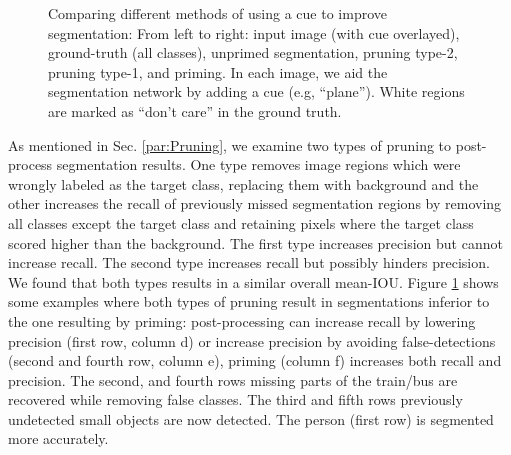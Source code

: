\documentclass[10pt,letterpaper,twocolumn]{article}
\begin{document}
\begin{figure}
\begin{centering}
\caption{\label{fig:summary-segmentation}Comparing different methods of using
a cue to improve segmentation: From left to right: input image (with
cue overlayed), ground-truth (all classes), unprimed segmentation,
pruning type-2, pruning type-1, and priming. In each image, we aid
the segmentation network by adding a cue (e.g, ``plane''). White
regions are marked as ``don't care'' in the ground truth. }
\par\end{centering}
\end{figure}

As mentioned in Sec. \ref{par:Pruning}, we examine two types of pruning
to post-process segmentation results. One type removes image regions
which were wrongly labeled as the target class, replacing them with
background and the other increases the recall of previously missed
segmentation regions by removing all classes except the target class
and retaining pixels where the target class scored higher than the
background. The first type increases precision but cannot increase
recall. The second type increases recall but possibly hinders precision.
We found that both types results in a similar overall mean-IOU. Figure
\ref{fig:summary-segmentation} shows some examples where both types
of pruning result in segmentations inferior to the one resulting by
priming: post-processing can increase recall by lowering precision
(first row, column d) or increase precision by avoiding false-detections
(second and fourth row, column e), priming (column f) increases both
recall and precision. The second, and fourth rows missing parts of
the train/bus are recovered while removing false classes. The third
and fifth rows previously undetected small objects are now detected.
The person (first row) is segmented more accurately. 
\end{document}
